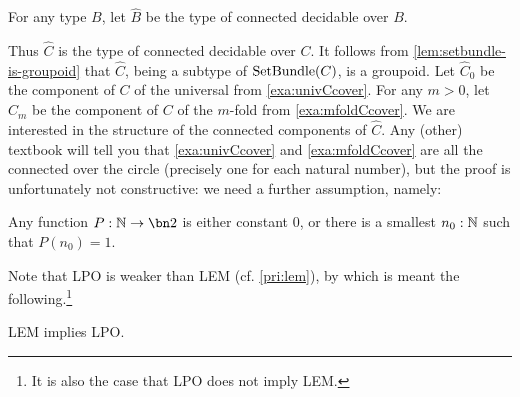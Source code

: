 \begin{definition} \label{def:hatCovering}
For any type $B$, let $\hat B$ be the type of connected decidable \coverings over $B$.
\end{definition}

Thus $\hat C$ is the type of connected decidable \coverings over $C$.
It follows from \cref{lem:setbundle-is-groupoid} that $\hat C$,
being a subtype of $\mathrm{SetBundle}(C)$, is a groupoid.
Let $\hat C_0$ be the component of $C$ of the universal \covering
from \cref{exa:univCcover}. For any $m>0$, let $\hat C_m$ be the component of $C$
of the $m$-fold \covering from \cref{exa:mfoldCcover}.
We are interested in the structure of the connected components of $\hat C$.
Any (other) textbook will tell you that \cref{exa:univCcover} and \cref{exa:mfoldCcover}
are all the connected \coverings over
the circle (precisely one for each natural number), but the proof is unfortunately not constructive:
we need a further assumption, namely:

\begin{principle}
  \label{LPO}
  Any function $P:\NN\to\bn 2$ is either constant $0$,
  or there is a smallest $n_0:\mathbb{N}$ such that $P(n_0)=1$.
\end{principle}

Note that LPO is weaker than LEM (cf. \cref{pri:lem}), by which is meant the following.\footnote{%
  It is also the case that LPO does not imply LEM.}
\begin{lemma}
  LEM implies LPO.
\end{lemma}

